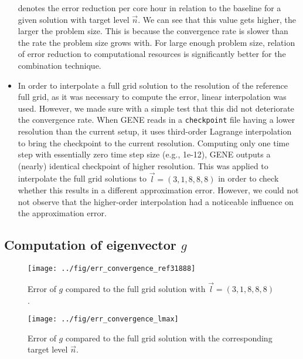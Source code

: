 \documentclass{scrartcl}
\begin{document}
\begin{itemize}
\begin{equation}
	\end{equation}
	denotes the error reduction per core hour in relation to the baseline for a given solution with target level $\vec{n}$.
	We can see that this value gets higher, the larger the problem size. 
	This is because the convergence rate is slower than the rate the problem size grows with. 
	For large enough problem size, relation of error reduction to computational resources is significantly better for the combination technique.
	\item In order to interpolate a full grid solution to the resolution of the reference full grid, as it was necessary to compute the error, linear interpolation was used. 
	However, we made sure with a simple test that this did not deteriorate the convergence rate.
When GENE reads in a \texttt{checkpoint} file having a lower resolution than the current setup, it uses third-order Lagrange interpolation to bring the checkpoint to the current resolution.
Computing only one time step with essentially zero time step size (e.g., 1e-12), GENE outputs a (nearly) identical checkpoint of higher resolution.
This was applied to interpolate the full grid solutions to $\vec{l} = (3,1,8,8,8)$ in order to check whether this results in a different approximation error. 
However, we could not not observe that the higher-order interpolation had a noticeable influence on the approximation error.
		
\end{itemize}

\subsection*{Computation of eigenvector $g$}

\begin{figure}[h]
	\centering
	\texttt{[image: ../fig/err\_convergence\_ref31888]}
	\caption{Error of $g$ compared to the full grid solution with $\vec{l} = (3,1,8,8,8)$. }
	\label{fig:err_convergence_ref31888}
\end{figure}

\begin{figure}[h]
	\centering
	\texttt{[image: ../fig/err\_convergence\_lmax]}
	\caption{Error of $g$ compared to the full grid solution with the corresponding target level $\vec{n}$. }
	\label{fig:err_convergence_lmax}
\end{figure}
\end{document}
